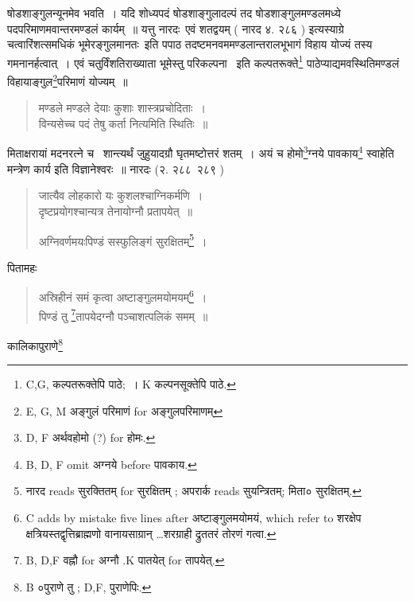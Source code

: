 \documentclass[11pt, openany]{book}
\begin{document}
\noindent
षोडशाङ्गुलन्यूनमेव भवति~। यदि शोध्यपदं षोडशाङ्गुलादल्पं तद षोडशाङ्गुलमण्डलमध्ये पदपरिमाणमवान्तरमण्डलं कार्यम्~॥ यत्तु नारदः\textendash\ एवं शतद्वयम् ( नारद ४. २८६ ) इत्यस्याग्रे चत्वारिंशत्समधिकं भूमेरङ्गुलमानतः\textendash\ इति पपाठ तदष्टमनवममण्डलान्तरालभूभागं विहाय योज्यं तस्य गमनानर्हत्वात्~। एवं चतुर्विंशतिराख्याता भूमेस्तु परिकल्पना \textendash\ इति कल्पतरूक्ते\renewcommand{\thefootnote}{1}\footnote{C,G, कल्पतरूक्तेपि पाठे;~। K कल्पनसूक्तेपि पाठे.} पाठेप्याद्यमवस्थितिमण्डलं विहायाङ्गुल\renewcommand{\thefootnote}{2}\footnote{E, G, M अङ्गुलं परिमाणं for अङ्गुलपरिमाणम्}परिमाणं योज्यम्~॥

\begin{quote}
{\vy मण्डले मण्डले देयाः कुशाः शास्त्रप्रचोदिताः~।\\
विन्यसेच्च पदं तेषु कर्ता नित्यमिति स्थितिः~॥}
\end{quote}

मिताक्षरायां मदनरत्ने च \textendash\ शान्त्यर्थं जुहुयादग्रौ घृतमष्टोत्तरं शतम्~। अयं च होमो\renewcommand{\thefootnote}{3}\footnote{D, F अर्थवहोमो (?) for होमः.}ग्नये पावकाय\renewcommand{\thefootnote}{4}\footnote{B, D, F omit अग्नये before पावकाय.} स्वाहेति मन्त्रेण कार्य इति विज्ञानेश्वरः~॥ नारदः (२. २८८\textendash\ २८९ )

\begin{quote}
{\vy जात्यैव लोहकारो यः कुशलश्चाग्निकर्मणि~।\\
दृष्टप्रयोगश्चान्यत्र तेनायोग्नौ प्रतापयेत्~॥

अग्निवर्णमयःपिण्डं सस्फुलिङ्गं सुरक्षितम्\renewcommand{\thefootnote}{5}\footnote{नारद reads सुरक्तितम् for सुरक्षितम् ; अपरार्क reads सुयन्त्रितम्; मिता० सुरक्षितम्.}~।}
\end{quote}

पितामहः

\begin{quote}
{\vy अस्रिहीनं समं कृत्वा अष्टाङ्गुलमयोमयम्\renewcommand{\thefootnote}{6}\footnote{C adds by mistake five lines after अष्टाङ्गुलमयोमयं, which refer to शरक्षेप {\qt क्षत्रियस्तद्वृत्तिब्राह्मणो वानायसाग्रान् \ldots शरग्राही द्रुततरं तोरणं गत्वा.}}~।\\
पिण्डं तु \renewcommand{\thefootnote}{7}\footnote{B, D,F वह्नौ for अग्नौ .K पातयेत् for तापयेत्.}तापयेदग्नौ पञ्चाशत्पलिकं समम्~॥}
\end{quote}

\newpage

कालिकापुराणे\renewcommand{\thefootnote}{1}\footnote{B ०पुराणे तु ; D,F, पुराणेपिः.}
\end{document}
